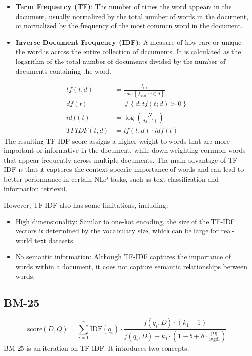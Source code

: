 \documentclass[12pt]{article}
\begin{document}
\begin{itemize}
\item {\textbf{Term Frequency (TF)}: The number of times the word appears in the document, usually normalized by the total number of words in the document, or normalized by the frequency of the most common word in the document. 
}
\item \textbf{Inverse Document Frequency (IDF)}{: A measure of how rare or unique the word is across the entire collection of documents. It is calculated as the logarithm of the total number of documents divided by the number of documents containing the word.}
\end{itemize}

\begin{align*}
tf(t,d) &= \frac{f_{t,d}}{ max\left\{f_{w,d}: w \in d\right\}}\\
df(t) &= \# \left\{ d: tf(t;d) > 0 \right\} \\
idf(t) &= \log\left(\frac{N}{df(t)}\right) \\
TFIDF(t,d) &= tf(t,d)\cdot idf(t)
\end{align*}
The resulting TF-IDF score assigns a higher weight to words that are more important or informative in the document, while down-weighting common words that appear frequently across multiple documents. The main advantage of TF-IDF is that it captures the context-specific importance of words and can lead to better performance in certain NLP tasks, such as text classification and information retrieval.

However, TF-IDF also has some limitations, including:

\begin{itemize}
\item High dimensionality: Similar to one-hot encoding, the size of the TF-IDF vectors is determined by the vocabulary size, which can be large for real-world text datasets.

\item No semantic information: Although TF-IDF captures the importance of words within a document, it does not capture semantic relationships between words.
\end{itemize}


\subsection{BM-25}
\begin{equation} \label{eq:bm25} \text{score}(D,Q) = \sum_{i=1}^{n} \text{IDF}(q_i) \cdot \frac{f(q_i, D) \cdot (k_1 + 1)}{f(q_i, D) + k_1 \cdot (1 - b + b \cdot \frac{|D|}{\text{avgdl}})} \end{equation}
BM-25 is an iteration on TF-IDF. It introduces two concepts.
\end{document}
